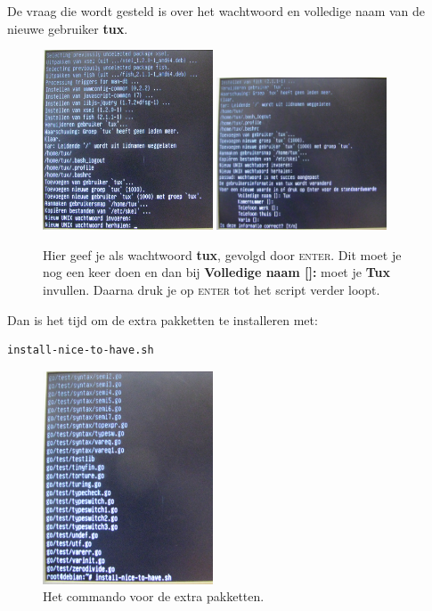 \documentclass[12pt,a4paper]{article}
\begin{document}
De vraag die wordt gesteld is over het wachtwoord en volledige naam van de nieuwe gebruiker \textbf{tux}.

\begin{figure}[H]
\centering
\includegraphics[width=0.45\textwidth]{tux-wachtwoord-scherm}
\includegraphics[width=0.45\textwidth]{tux-volledige-naam-scherm}
\caption{Hier geef je als wachtwoord \textbf{tux}, gevolgd door \textsc{enter}. Dit moet je nog een keer doen en dan bij \textbf{Volledige naam []:} moet je \textbf{Tux} invullen. Daarna druk je op \textsc{enter} tot het script verder loopt.}
\label{fig:tuxinfo}
\end{figure}

Dan is het tijd om de extra pakketten te installeren met:
\begin{lstlisting}[language=bash]
install-nice-to-have.sh
\end{lstlisting}

\begin{figure}[H]
\centering
\includegraphics[width=0.45\textwidth]{install-nice-to-have-scherm}
\caption{Het commando voor de extra pakketten.}
\label{fig:nicetohave}
\end{figure}
\end{document}

